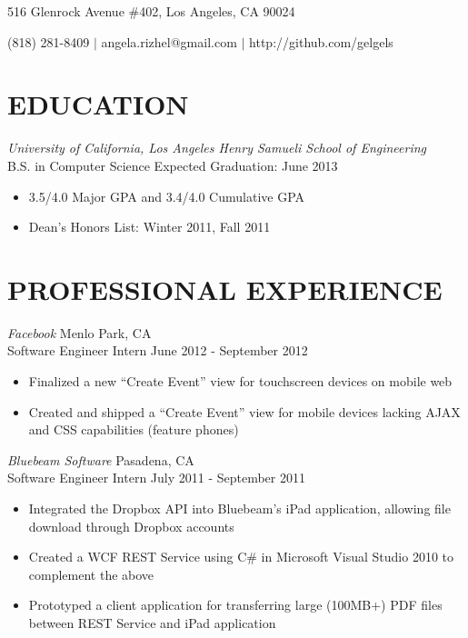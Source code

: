 \documentclass{res}
\begin{document}

\begin{resume}
\centerline{516 Glenrock Avenue \#402, Los Angeles, CA 90024}
\centerline{(818) 281-8409 $|$ angela.rizhel@gmail.com $|$ http://github.com/gelgels }
\vspace{-4pt}

\section{EDUCATION}
\vspace{6pt}
{\sl{University of California}, Los Angeles \hfill Henry Samueli School of Engineering} \\
B.S. in Computer Science \hfill Expected Graduation: June 2013

\begin{itemize} \itemsep -2pt %
  \item 3.5/4.0 Major GPA and 3.4/4.0 Cumulative GPA
  \item Dean's Honors List: Winter 2011, Fall 2011
\end{itemize} \vspace{-6pt}

\section{PROFESSIONAL EXPERIENCE}
\vspace{6pt}
  {\sl Facebook} \hfill Menlo Park, CA \\
  Software Engineer Intern \hfill June 2012 - September 2012

   \begin{itemize} \itemsep -2pt %
     \item Finalized a new ``Create Event'' view for touchscreen devices on mobile web
     \item Created and shipped a ``Create Event'' view for mobile devices lacking AJAX and CSS capabilities (feature phones)
   \end{itemize} \vspace{-6pt}

 {\sl Bluebeam Software} \hfill Pasadena, CA \\
 Software Engineer Intern \hfill July 2011 - September 2011

   \begin{itemize} \itemsep -2pt
   \item Integrated the Dropbox API into Bluebeam's iPad application, allowing file download through Dropbox accounts
   \item Created a WCF REST Service using C\# in Microsoft Visual Studio 2010 to complement the above
   \item Prototyped a client application for transferring large (100MB+) PDF files between  REST Service and iPad application
   \end{itemize} \vspace{-12pt}


\end{resume}
\end{document}
